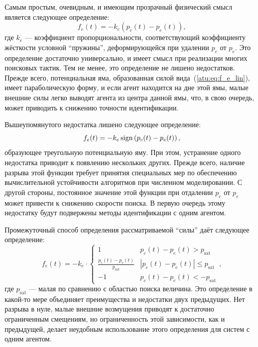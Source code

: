 Самым простым,  очевидным, и имеющим прозрачный физический смысл является
следующее определение:
%
\begin{equation}
  f_e(t) = - k_e \left( p_c(t) - p_e(t) \right)  ,
  \label{atu:eq:f_e_lin}
\end{equation}
%
где $k_e$ --- коэффициент пропорциональности, соответствующий
коэффициенту жёсткости условной ``пружины'', деформирующейся
при удалении $p_c$ от $p_e$. Это определение достаточно универсально,
и имеет смысл при реализации многих поисковых тактик. Тем не менее,
это определение не лишено недостатков. Прежде всего,
потенциальная яма, образованная силой вида~(\ref{atu:eq:f_e_lin}),
имеет параболическую форму, и если агент находится на дне этой
ямы, малые внешние силы легко выводят агента из центра данной ямы,
что, в свою очередь, может приводить к снижению точности идентификации.

Вышеупомянутого недостатка лишено следующее определение:
%
\begin{equation}
  f_e(t) = - k_e \operatorname*{sign} \left( p_c(t) - p_e(t) \right) ,
  \label{atu:eq:f_e_sign}
\end{equation}
%
образующее треугольную потенциальную яму. При этом,
устранение одного недостатка приводит к появлению
нескольких других. Прежде всего, наличие разрыва
этой функции требует принятия специальных мер по обеспечению
вычислительной устойчивости алгоритмов при
численном моделировании. С другой стороны,
постоянное значение этой функции при отдалении
$p_c$ от $p_e$ может привести к снижению скорости поиска.
В первую очередь этому недостатку будут подвержены
методы идентификации с одним агентом.

Промежуточный способ определения рассматриваемой ``силы''
даёт следующее определение:
%
\begin{equation}
  f_e(t)
  = - k_e \cdot
  \begin{cases}
    1 &  p_c(t) - p_e(t)  > p_\mathrm{sat}
    \\
    \frac{p_c(t)-p_e(t)}{p_\mathrm{sat}} & | p_c(t)-p_e(t)| \le p_\mathrm{sat}
    \\
    -1 &  p_c(t) - p_e(t)  < -p_\mathrm{sat}
  \end{cases},
  \label{atu:eq:f_e_sat}
\end{equation}
%
где  $p_\mathrm{sat}$ --- малая по сравнению с областью поиска величина.
Это определение в какой-то мере объединяет преимущества и недостатки
двух предыдущих.  Нет разрыва в нуле, малые внешние возмущения
приводят к достаточно ограниченным смещениям, но
ограниченность этой зависимости, как и предыдущей,
делает неудобным использование этого определения для систем с одним агентом.

